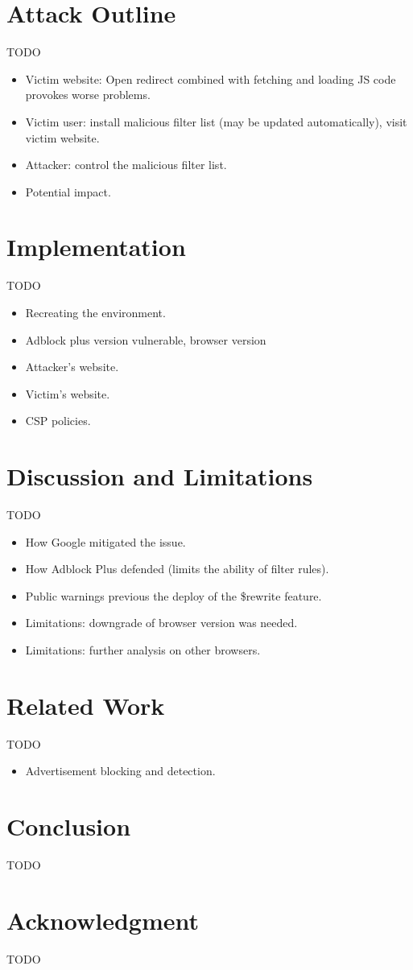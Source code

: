 \documentclass[conference]{IEEEtran}
\begin{document}
\section{Attack Outline}
TODO
\begin{itemize}
\item Victim website: Open redirect combined with fetching and loading JS code provokes worse problems.
\item Victim user: install malicious filter list (may be updated automatically), visit victim website.
\item Attacker: control the malicious filter list.
\item Potential impact.
\end{itemize}

\section{Implementation}
TODO
\begin{itemize}
\item Recreating the environment.
\item Adblock plus version vulnerable, browser version
\item Attacker’s website.
\item Victim’s website.
\item CSP policies.
\end{itemize}

\section{Discussion and Limitations}
TODO
\begin{itemize}
\item How Google mitigated the issue.
\item How Adblock Plus defended (limits the ability of filter rules).
\item Public warnings previous the deploy of the \$rewrite feature.
\item Limitations: downgrade of browser version was needed.
\item Limitations: further analysis on other browsers.
\end{itemize}

\section{Related Work}
TODO
\begin{itemize}
\item Advertisement blocking and detection.
\end{itemize}

\section{Conclusion}
TODO

\section*{Acknowledgment}
TODO



\end{document}
